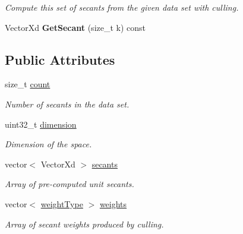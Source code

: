 \begin{DoxyCompactItemize}
\begin{DoxyCompactList}\small\item\em Compute this set of secants from the given data set with culling. \end{DoxyCompactList}\item 
\hypertarget{struct_d_r_d_s_p_1_1_secants_a21ff677ea2698d6de90941403daa68c9}{Vector\-Xd {\bfseries Get\-Secant} (size\-\_\-t k) const }\label{struct_d_r_d_s_p_1_1_secants_a21ff677ea2698d6de90941403daa68c9}

\end{DoxyCompactItemize}
\subsection*{Public Attributes}
\begin{DoxyCompactItemize}
\item 
\hypertarget{struct_d_r_d_s_p_1_1_secants_a821f5d19109ca4f94a7fb593614ac173}{size\-\_\-t \hyperlink{struct_d_r_d_s_p_1_1_secants_a821f5d19109ca4f94a7fb593614ac173}{count}}\label{struct_d_r_d_s_p_1_1_secants_a821f5d19109ca4f94a7fb593614ac173}

\begin{DoxyCompactList}\small\item\em Number of secants in the data set. \end{DoxyCompactList}\item 
\hypertarget{struct_d_r_d_s_p_1_1_secants_a950d625f7d298f93eaad20062f79db1b}{uint32\-\_\-t \hyperlink{struct_d_r_d_s_p_1_1_secants_a950d625f7d298f93eaad20062f79db1b}{dimension}}\label{struct_d_r_d_s_p_1_1_secants_a950d625f7d298f93eaad20062f79db1b}

\begin{DoxyCompactList}\small\item\em Dimension of the space. \end{DoxyCompactList}\item 
\hypertarget{struct_d_r_d_s_p_1_1_secants_a1ea6387e35af61db236e3c9053fb5161}{vector$<$ Vector\-Xd $>$ \hyperlink{struct_d_r_d_s_p_1_1_secants_a1ea6387e35af61db236e3c9053fb5161}{secants}}\label{struct_d_r_d_s_p_1_1_secants_a1ea6387e35af61db236e3c9053fb5161}

\begin{DoxyCompactList}\small\item\em Array of pre-\/computed unit secants. \end{DoxyCompactList}\item 
\hypertarget{struct_d_r_d_s_p_1_1_secants_a534beb61e939e136580727be9296c8a8}{vector$<$ \hyperlink{namespace_d_r_d_s_p_a955ec80e50da3c3f17008affbdd1ca04}{weight\-Type} $>$ \hyperlink{struct_d_r_d_s_p_1_1_secants_a534beb61e939e136580727be9296c8a8}{weights}}\label{struct_d_r_d_s_p_1_1_secants_a534beb61e939e136580727be9296c8a8}

\begin{DoxyCompactList}\small\item\em Array of secant weights produced by culling. \end{DoxyCompactList}\end{DoxyCompactItemize}


